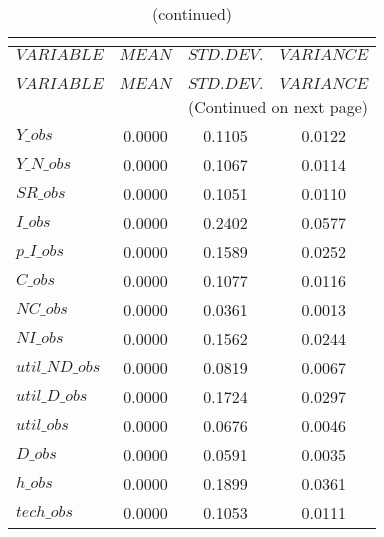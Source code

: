  
\begin{center}
\begin{longtable}{lccc} 
\caption{THEORETICAL MOMENTS}\\
 \label{Table:th_moments}\\
\toprule 
$VARIABLE       $	 & 	 $         MEAN$	 & 	 $    STD. DEV.$	 & 	 $     VARIANCE$\\
\midrule \endfirsthead 
\caption{(continued)}\\
 \toprule \\ 
$VARIABLE       $	 & 	 $         MEAN$	 & 	 $    STD. DEV.$	 & 	 $     VARIANCE$\\
\midrule \endhead 
\midrule \multicolumn{4}{r}{(Continued on next page)} \\ \bottomrule \endfoot 
\bottomrule \endlastfoot 
$Y\_obs         $	 & 	       0.0000	 & 	       0.1105	 & 	       0.0122 \\ 
$Y\_N\_obs      $	 & 	       0.0000	 & 	       0.1067	 & 	       0.0114 \\ 
$SR\_obs        $	 & 	       0.0000	 & 	       0.1051	 & 	       0.0110 \\ 
$I\_obs         $	 & 	       0.0000	 & 	       0.2402	 & 	       0.0577 \\ 
$p\_I\_obs      $	 & 	       0.0000	 & 	       0.1589	 & 	       0.0252 \\ 
$C\_obs         $	 & 	       0.0000	 & 	       0.1077	 & 	       0.0116 \\ 
$NC\_obs        $	 & 	       0.0000	 & 	       0.0361	 & 	       0.0013 \\ 
$NI\_obs        $	 & 	       0.0000	 & 	       0.1562	 & 	       0.0244 \\ 
$util\_ND\_obs  $	 & 	       0.0000	 & 	       0.0819	 & 	       0.0067 \\ 
$util\_D\_obs   $	 & 	       0.0000	 & 	       0.1724	 & 	       0.0297 \\ 
$util\_obs      $	 & 	       0.0000	 & 	       0.0676	 & 	       0.0046 \\ 
$D\_obs         $	 & 	       0.0000	 & 	       0.0591	 & 	       0.0035 \\ 
$h\_obs         $	 & 	       0.0000	 & 	       0.1899	 & 	       0.0361 \\ 
$tech\_obs      $	 & 	       0.0000	 & 	       0.1053	 & 	       0.0111 \\ 
\end{longtable}
 \end{center}
